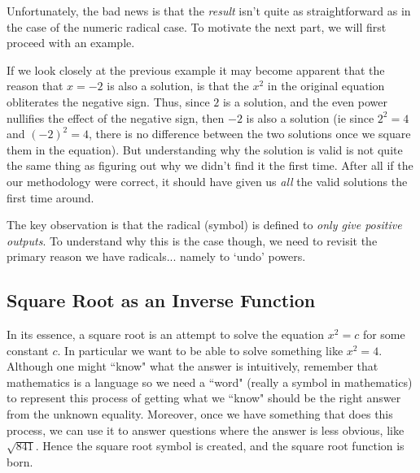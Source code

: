         Unfortunately, the bad news is that the \textit{result} isn't quite as straightforward as in the case of the numeric radical case. To motivate the next part, we will first proceed with an example.


        If we look closely at the previous example it may become apparent that the reason that $x = -2$ is also a solution, is that the $x^2$ in the original equation obliterates the negative sign. Thus, since $2$ is a solution, and the even power nullifies the effect of the negative sign, then $-2$ is also a solution (ie since $2^2 = 4$ and $(-2)^2 = 4$, there is no difference between the two solutions once we square them in the equation). But understanding why the solution is valid is not quite the same thing as figuring out why we didn't find it the first time. After all if the our methodology were correct, it should have given us \textit{all} the valid solutions the first time around.

        The key observation is that the radical (symbol) is defined to \textit{only give positive outputs}. To understand why this is the case though, we need to revisit the primary reason we have radicals... namely to `undo' powers.

\subsection{Square Root as an Inverse Function}
    In its essence, a square root is an attempt to solve the equation $x^2 = c$ for some constant $c$. In particular we want to be able to solve something like $x^2 = 4$. Although one might ``know" what the answer is intuitively, remember that mathematics is a language so we need a ``word" (really a symbol in mathematics) to represent this process of getting what we ``know" should be the right answer from the unknown equality. Moreover, once we have something that does this process, we can use it to answer questions where the answer is less obvious, like $\sqrt{841}$. Hence the square root symbol is created, and the square root function is born.

